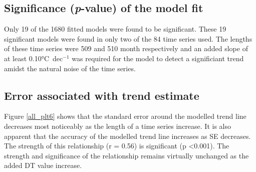 \documentclass{ametsoc}
\begin{document}
\subsection{Significance (\emph{p}-value) of the model fit}
Only 19 of the 1680 fitted models were found to be significant. These 19 significant models were found in only two of the 84 time series used. The lengths of these time series were 509 and 510 month respectively and an added slope of at least 0.10\si{\degreeCelsius}~dec$^{-1}$ was required for the model to detect a significiant trend amidst the natural noise of the time series. 

\subsection{Error associated with trend estimate}
Figure \ref{all_plt6} shows that the standard error around the modelled trend line decreases most noticeably as the length of a time series increase. It is also apparent that the accuracy of the modelled trend line increases as SE decreases. The strength of this relationship (r = 0.56) is significant (p <0.001). The strength and significance of the relationship remains virtually unchanged as the added DT value increase.

\end{document}
